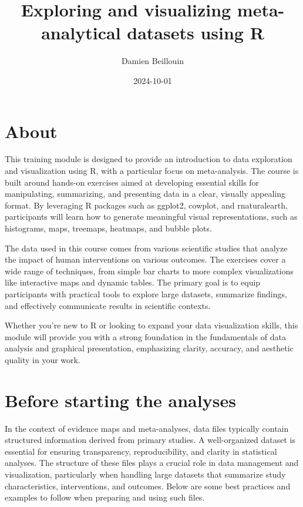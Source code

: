\documentclass[
]{book}
\title{Exploring and visualizing meta-analytical datasets using R}
\author{Damien Beillouin}
\date{2024-10-01}
\begin{document}
\maketitle

{
\setcounter{tocdepth}{1}
\tableofcontents
}
\chapter{About}\label{about}

This training module is designed to provide an introduction to data exploration and visualization using R, with a particular focus on meta-analysis. The course is built around hands-on exercises aimed at developing essential skills for manipulating, summarizing, and presenting data in a clear, visually appealing format. By leveraging R packages such as ggplot2, cowplot, and rnaturalearth, participants will learn how to generate meaningful visual representations, such as histograms, maps, treemaps, heatmaps, and bubble plots.

The data used in this course comes from various scientific studies that analyze the impact of human interventions on various outcomes. The exercises cover a wide range of techniques, from simple bar charts to more complex visualizations like interactive maps and dynamic tables. The primary goal is to equip participants with practical tools to explore large datasets, summarize findings, and effectively communicate results in scientific contexts.

Whether you're new to R or looking to expand your data visualization skills, this module will provide you with a strong foundation in the fundamentals of data analysis and graphical presentation, emphasizing clarity, accuracy, and aesthetic quality in your work.

\chapter{Before starting the analyses}\label{before-starting-the-analyses}

In the context of evidence maps and meta-analyses, data files typically contain structured information derived from primary studies.
A well-organized dataset is essential for ensuring transparency, reproducibility, and clarity in statistical analyses.
The structure of these files plays a crucial role in data management and visualization, particularly when handling large datasets that summarize study characteristics, interventions, and outcomes.
Below are some best practices and examples to follow when preparing and using such files.
\end{document}
